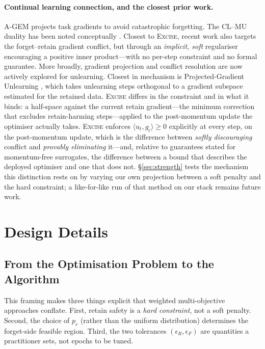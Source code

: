 \documentclass{article}
\newcommand{\ours}{\textsc{Excise}}
\newcommand{\gr}{g_{\mathrm{r}}}
\newcommand{\added}[1]{{\color{revised}#1}}
\theoremstyle{remark}
\theoremstyle{plain}
\begin{document}
\paragraph{Continual learning connection, and the closest prior work.}
A-GEM \citep{chaudhry2019agem} projects task gradients to avoid catastrophic
forgetting. The CL--MU duality has been noted conceptually
\citep{nguyen2020variational,kurmanji2023unbounded}. Closest to \ours{}, recent
work \citep{patel2025learning} also targets the forget--retain gradient
conflict, but through an \emph{implicit, soft} regulariser encouraging a positive
inner product---with no per-step constraint and no formal guarantee. More
broadly, gradient projection and conflict resolution are now actively explored
for unlearning. \added{Closest in mechanism is Projected-Gradient Unlearning
\citep{hoang2024learn}, which takes unlearning steps orthogonal to a gradient
subspace estimated for the retained data. \ours{} differs in the constraint and in
what it binds: a half-space against the current retain gradient---the minimum
correction that excludes retain-harming steps---applied to the post-momentum
update the optimiser actually takes.} \ours{} enforces $\langle u_t,\gr\rangle \ge 0$ explicitly at every
step, on the post-momentum update, which is the difference between \emph{softly
discouraging} conflict and \emph{provably eliminating} it---and, relative to
guarantees stated for momentum-free surrogates, the difference between a bound
that describes the deployed optimiser and one that does not.
\S\ref{sec:strength} tests the mechanism this distinction rests on by varying
our own projection between a soft penalty and the hard constraint; a
like-for-like run of that method on our stack remains future work.

\section{Design Details}\label{app:method}

\subsection{From the Optimisation Problem to the Algorithm}

This framing makes three things explicit that weighted multi-objective
approaches conflate. First, retain safety is a \emph{hard constraint}, not a
soft penalty. Second, the choice of $p_r$ (rather than the uniform distribution)
determines the forget-side feasible region. Third, the two tolerances
$(\epsilon_R, \epsilon_F)$ are quantities a practitioner sets, not epochs to be
tuned.
\end{document}
